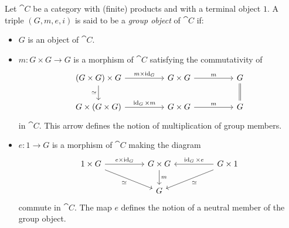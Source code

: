 \begin{definition}
    \label{def:group-object}
    Let \(\cat C\) be a category with (finite) products and with a terminal object
    \(1\). A triple \((G, m, e, i)\) is said to be a \emph{group object} of
    \(\cat C\) if:
    \begin{itemize}\setlength\itemsep{0em}
        \item \(G\) is an object of \(\cat C\).

        \item \(m: G \times G \to G\) is a morphism of \(\cat C\) satisfying the
              commutativity of
              \[
                  \begin{tikzcd}
                      (G \times G) \times G \ar[d, "\dis"'] \ar[rr, "m \times \Id_G"]
                      &
                      &G \times G \ar[rr, "m"]
                      &
                      &G \ar[d, equals]
                      \\
                      G \times (G \times G) \ar[rr, "\Id_G \times m"]
                      &
                      &G \times G \ar[rr, "m"]
                      &
                      &G
                  \end{tikzcd}
              \]
              in \(\cat C\). This arrow defines the notion of multiplication of group
              members.

        \item \(e: 1 \to G\) is a morphism of \(\cat C\) making the diagram
              \[
                  \begin{tikzcd}
                      1 \times G \ar[rr, "e \times \Id_{G}"]
                      \ar[rrd, "\dis"']
                      &
                      &G \times G \ar[d, "m"]
                      &
                      &G \times 1 \ar[ll, "\Id_G \times e"']
                      \ar[lld, "\dis"]
                      \\
                      &
                      &G
                      &
                  \end{tikzcd}
              \]
              commute in \(\cat C\). The map \(e\) defines the notion of a neutral member
              of the group object.


\end{itemize}
\end{definition}
